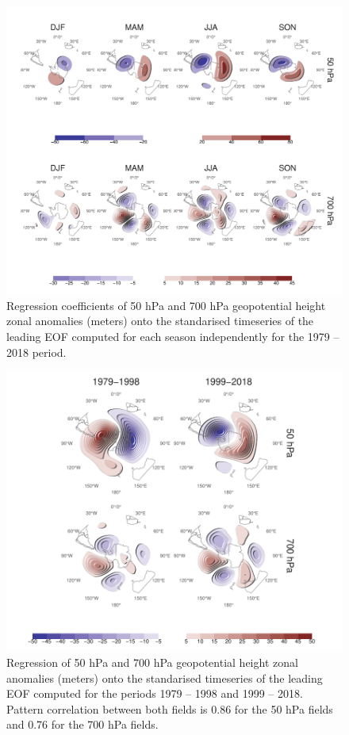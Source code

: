 \documentclass[smallextended]{svjour3}       %
\begin{document}
\begin{figure}
\includegraphics{A5-1} \caption{Regression coefficients of 50 hPa and 700 hPa geopotential height zonal anomalies (meters) onto the standarised timeseries of the leading EOF computed for each season independently for the 1979 -- 2018 period.}\label{fig:A5}
\end{figure}

\begin{figure}
\includegraphics{A6-1} \caption{Regression of 50 hPa and 700 hPa geopotential height zonal anomalies (meters) onto the standarised timeseries of the leading EOF computed for the periods 1979 -- 1998 and 1999 -- 2018. Pattern correlation between both fields is 0.86 for the 50 hPa fields and 0.76 for the 700 hPa fields.}\label{fig:A6}
\end{figure}

\newpage



\end{document}
